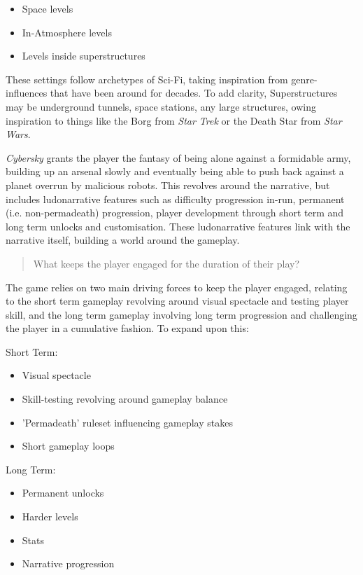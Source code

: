 \documentclass{scrartcl}
\begin{document}
\begin{itemize}
  \item Space levels
  \item In-Atmosphere levels
  \item Levels inside superstructures
\end{itemize}

These settings follow archetypes of Sci-Fi, taking inspiration from genre-influences that have been around for decades. To add clarity, Superstructures may be underground tunnels, space stations, any large structures, owing inspiration to things like the Borg from \emph{Star Trek} or the Death Star from \emph{Star Wars}.

\emph{Cybersky} grants the player the fantasy of being alone against a formidable army, building up an arsenal slowly and eventually being able to push back against a planet overrun by malicious robots. This revolves around the narrative, but includes ludonarrative features such as difficulty progression in-run, permanent (i.e. non-permadeath) progression, player development through short term and long term unlocks and customisation. These ludonarrative features link with the narrative itself, building a world around the gameplay.

\begin{quote}
  What keeps the player engaged for the duration of their play?
\end{quote}

The game relies on two main driving forces to keep the player engaged, relating to the short term gameplay revolving around visual spectacle and testing player skill, and the long term gameplay involving long term progression and challenging the player in a cumulative fashion. To expand upon this:

Short Term:

\begin{itemize}
  \item Visual spectacle
  \item Skill-testing revolving around gameplay balance
  \item 'Permadeath' ruleset influencing gameplay stakes
  \item Short gameplay loops
\end{itemize}

Long Term:

\begin{itemize}
  \item Permanent unlocks
  \item Harder levels
  \item Stats
  \item Narrative progression
\end{itemize}
\end{document}
